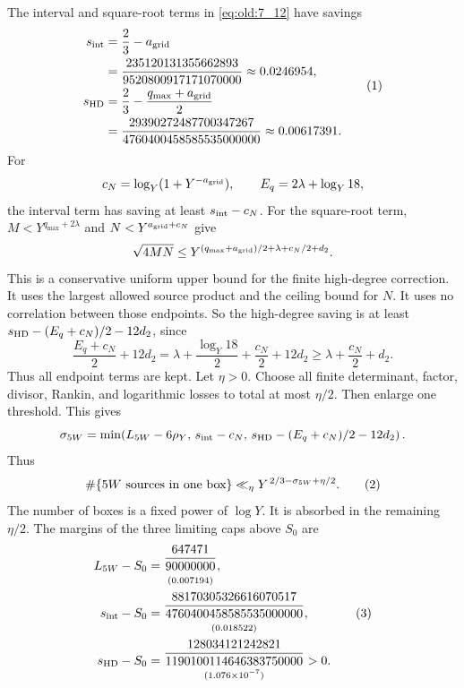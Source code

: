 The interval and square-root terms in \eqref{eq:old:7_12} have savings
\[
\begin{aligned}
 s_{\rm int}&=\frac23-a_{\rm grid}\\
 &=\frac{235120131355662893}{9520800917171070000}
   \approx0.0246954,\\
 s_{\rm HD}&=\frac23-\frac{q_{\max}+a_{\rm grid}}{2}\\
 &=\frac{29390272487700347267}{4760400458585535000000}
   \approx0.00617391.
\end{aligned}\AutoTag{eq:old:7_24}
\]
For
\[
 c_N=\log_Y(1+Y^{-a_{\rm grid}}),\qquad E_q=2\lambda+\log_Y18,
\]
the interval term has saving at least \(s_{\rm int}-c_N\). For the
square-root term, \(M<Y^{q_{\max}+2\lambda}\) and
\(N<Y^{a_{\rm grid}+c_N}\) give
\[
 \sqrt{4MN}
 \le Y^{(q_{\max}+a_{\rm grid})/2+\lambda+c_N/2+d_2}.
\]
This is a conservative uniform upper bound for the finite high-degree
correction. It uses the largest allowed source product and the ceiling
bound for \(N\). It uses no correlation between those endpoints.
So the high-degree saving is at least
\(s_{\rm HD}-(E_q+c_N)/2-12d_2\), since
\[
 \frac{E_q+c_N}{2}+12d_2
 =\lambda+\frac{\log_Y18}{2}+\frac{c_N}{2}+12d_2
 \ge\lambda+\frac{c_N}{2}+d_2.
\]
Thus all endpoint terms are kept. Let
\(\eta>0\). Choose all finite determinant, factor, divisor,
Rankin, and logarithmic losses to total at most \(\eta/2\). Then
enlarge one threshold. This gives
\[
\sigma_{5W}=\min\!\left(L_{5W}-6\rho_Y,\,
 s_{\rm int}-c_N,\,
 s_{\rm HD}-(E_q+c_N)/2-12d_2\right).
\]
Thus
\[
 \#\{5W\text{ sources in one box}\}
 \ll_\eta Y^{\,2/3-\sigma_{5W}+\eta/2}.
\AutoTag{eq:old:7_25}
\]
The number of boxes is a fixed power of \(\log Y\). It is absorbed in
the remaining \(\eta/2\). The margins of the three limiting caps above
\(S_0\) are
\[
\begin{aligned}
 L_{5W}-S_0&=\begin{gathered}\frac{647471}{90000000}\\[-2pt]\text{\scriptsize (0.007194)}\end{gathered},\\
 s_{\rm int}-S_0&=\begin{gathered}\frac{88170305326616070517}{4760400458585535000000}\\[-2pt]\text{\scriptsize (0.018522)}\end{gathered},\\
 s_{\rm HD}-S_0&=\begin{gathered}\frac{128034121242821}{1190100114646383750000}\\[-2pt]\text{\scriptsize (1.076$\times10^{-7}$)}\end{gathered}>0.
\end{aligned}
\AutoTag{eq:old:7_26}
\]
